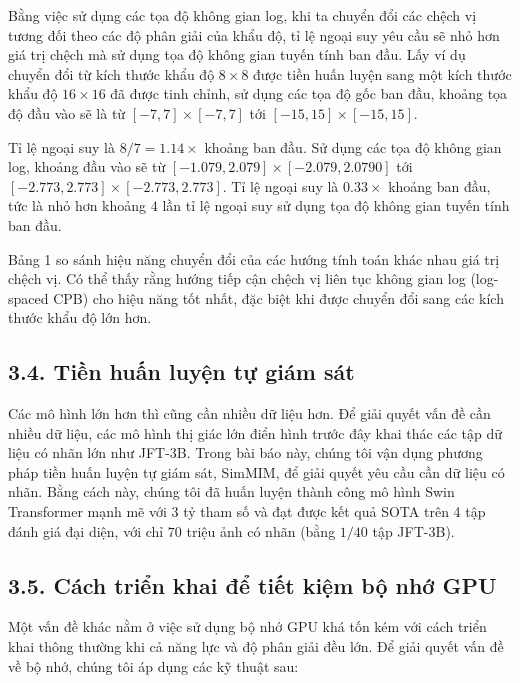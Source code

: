 \documentclass[times, twocolumn]{zHenriquesLab-StyleBioRxiv}
\begin{document}
Bằng việc sử dụng các tọa độ không gian log, khi ta chuyển đổi các chệch vị tương đối theo các độ phân giải của khẩu độ, tỉ lệ ngoại suy yêu cầu sẽ nhỏ hơn giá trị chệch mà sử dụng tọa độ không gian tuyến tính ban đầu. Lấy ví dụ chuyển đổi từ kích thước khẩu độ $8 \times 8$ được tiền huấn luyện sang một kích thước khẩu độ $16\times16$ đã được tinh chỉnh, sử dụng các tọa độ gốc ban đầu, khoảng tọa độ đầu vào sẽ là từ $[-7,7]\times[-7,7]$ tới $[-15,15]\times[-15,15]$.

Tỉ lệ ngoại suy là $8/7=1.14 \times$ khoảng ban đầu. Sử dụng các tọa độ không gian log, khoảng đầu vào sẽ từ $[-1.079,2.079] \times [-2.079,2.0790]$ tới $[-2.773,2.773]\times[-2.773,2.773]$. Tỉ lệ ngoại suy là $0.33\times$ khoảng ban đầu, tức là nhỏ hơn khoảng $4$ lần tỉ lệ ngoại suy sử dụng tọa độ không gian tuyến tính ban đầu.

Bảng 1 so sánh hiệu năng chuyển đổi của các hướng tính toán khác nhau giá trị chệch vị. Có thể thấy rằng hướng tiếp cận chệch vị liên tục không gian log (log-spaced CPB) cho hiệu năng tốt nhất, đặc biệt khi được chuyển đổi sang các kích thước khẩu độ lớn hơn.

\subsection*{3.4. Tiền huấn luyện tự giám sát}

Các mô hình lớn hơn thì cũng cần nhiều dữ liệu hơn. Để giải quyết vấn đề cần nhiều dữ liệu, các mô hình thị giác lớn điển hình trước đây khai thác các tập dữ liệu có nhãn lớn như JFT-3B. Trong bài báo này, chúng tôi vận dụng phương pháp tiền huấn luyện tự giám sát, SimMIM, để giải quyết yêu cầu cần dữ liệu có nhãn. Bằng cách này, chúng tôi đã huấn luyện thành công mô hình Swin Transformer mạnh mẽ với $3$ tỷ tham số và đạt được kết quả SOTA trên 4 tập đánh giá đại diện, với chỉ $70$ triệu ảnh có nhãn (bằng $1/40$ tập JFT-3B).


\subsection*{3.5. Cách triển khai để tiết kiệm bộ nhớ GPU}

Một vấn đề khác nằm ở việc sử dụng bộ nhớ GPU khá tốn kém với cách triển khai thông thường khi cả năng lực và độ phân giải đều lớn. Để giải quyết vấn đề về bộ nhớ, chúng tôi áp dụng các kỹ thuật sau:
\end{document}
